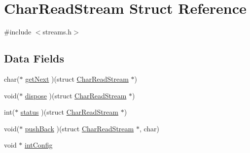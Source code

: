 \hypertarget{structCharReadStream}{\section{Char\+Read\+Stream Struct Reference}
\label{structCharReadStream}
}


{\ttfamily \#include $<$streams.\+h$>$}

\subsection*{Data Fields}
\begin{DoxyCompactItemize}
\item 
char($\ast$ \hyperlink{structCharReadStream_a09b21830d1105a95d9a92b0a49fedad5}{get\+Next} )(struct \hyperlink{structCharReadStream}{Char\+Read\+Stream} $\ast$)
\item 
void($\ast$ \hyperlink{structCharReadStream_a93a3bc86d1bd1fd5474cc7560c99064b}{dispose} )(struct \hyperlink{structCharReadStream}{Char\+Read\+Stream} $\ast$)
\item 
int($\ast$ \hyperlink{structCharReadStream_a6932167a4c9ee2fd7b56219bebdfdb9f}{status} )(struct \hyperlink{structCharReadStream}{Char\+Read\+Stream} $\ast$)
\item 
void($\ast$ \hyperlink{structCharReadStream_ad228a25b65700caa315dc98f8a1cb067}{push\+Back} )(struct \hyperlink{structCharReadStream}{Char\+Read\+Stream} $\ast$, char)
\item 
void $\ast$ \hyperlink{structCharReadStream_a77994823bffd8c98b260a0e8a2686903}{int\+Config}
\end{DoxyCompactItemize}


